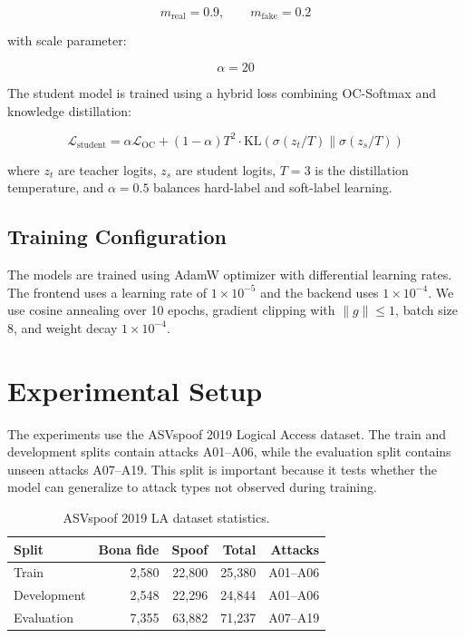 \documentclass[sigconf]{acmart}
\begin{document}
\[
m_{\text{real}} = 0.9, \qquad m_{\text{fake}} = 0.2
\]

with scale parameter:

\[
\alpha = 20
\]

The student model is trained using a hybrid loss combining OC-Softmax and knowledge distillation:

\[
\mathcal{L}_{\text{student}}
=
\alpha \mathcal{L}_{\text{OC}}
+
(1-\alpha) T^2
\cdot
\text{KL}
\left(
\sigma(z_t/T)
\|
\sigma(z_s/T)
\right)
\]

where $z_t$ are teacher logits, $z_s$ are student logits, $T=3$ is the distillation temperature, and $\alpha=0.5$ balances hard-label and soft-label learning.

\subsection{Training Configuration}

The models are trained using AdamW optimizer with differential learning rates. The frontend uses a learning rate of $1 \times 10^{-5}$ and the backend uses $1 \times 10^{-4}$. We use cosine annealing over 10 epochs, gradient clipping with $\|g\| \leq 1$, batch size 8, and weight decay $1 \times 10^{-4}$.

\section{Experimental Setup}

The experiments use the ASVspoof 2019 Logical Access dataset. The train and development splits contain attacks A01--A06, while the evaluation split contains unseen attacks A07--A19. This split is important because it tests whether the model can generalize to attack types not observed during training.

\begin{table}[h]
\centering
\caption{ASVspoof 2019 LA dataset statistics.}
\label{tab:dataset}
\begin{tabular}{lrrrr}
\toprule
Split & Bona fide & Spoof & Total & Attacks \\
\midrule
Train & 2,580 & 22,800 & 25,380 & A01--A06 \\
Development & 2,548 & 22,296 & 24,844 & A01--A06 \\
Evaluation & 7,355 & 63,882 & 71,237 & A07--A19 \\
\bottomrule
\end{tabular}
\end{table}
\end{document}

